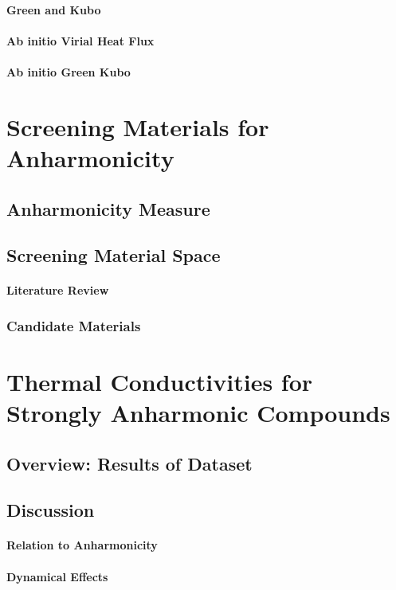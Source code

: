 \documentclass[a4paper,12pt]{book}
\begin{document}
\subsubsection{Green and Kubo}
\subsubsection{Ab initio Virial Heat Flux}
\subsubsection{Ab initio Green Kubo}

\chapter{Screening Materials for Anharmonicity}
\section{Anharmonicity Measure}
\section{Screening Material Space}
\subsubsection{Literature Review}
\subsection{Candidate Materials}

\chapter{Thermal Conductivities for Strongly Anharmonic Compounds}
\section{Overview: Results of Dataset}
\section{Discussion}
\subsubsection{Relation to Anharmonicity}
\subsubsection{Dynamical Effects}
\end{document}

